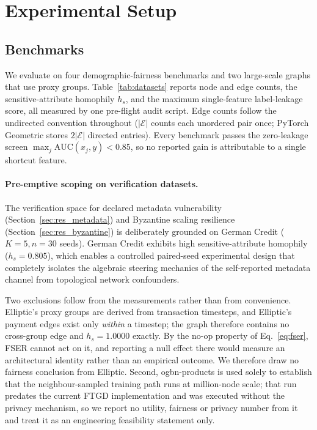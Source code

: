 \documentclass[preprint,12pt]{elsarticle}
\theoremstyle{plain}
\theoremstyle{definition}
\theoremstyle{remark}
\begin{document}
\section{Experimental Setup}
\label{sec:setup}

\subsection{Benchmarks}
\label{sec:datasets}
We evaluate on four demographic-fairness benchmarks and two large-scale graphs that use proxy groups. Table~\ref{tab:datasets} reports node and edge counts, the sensitive-attribute homophily $h_s$, and the maximum single-feature label-leakage score, all measured by one pre-flight audit script. Edge counts follow the undirected convention throughout ($\lvert\mathcal{E}\rvert$ counts each unordered pair once; PyTorch Geometric stores $2\lvert\mathcal{E}\rvert$ directed entries). Every benchmark passes the zero-leakage screen $\max_j \mathrm{AUC}(x_j,y) < 0.85$, so no reported gain is attributable to a single shortcut feature.



\paragraph{Pre-emptive scoping on verification datasets.}
The verification space for declared metadata vulnerability (Section~\ref{sec:res_metadata}) and Byzantine scaling resilience (Section~\ref{sec:res_byzantine}) is deliberately grounded on German Credit ($K=5, n=30$ seeds). German Credit exhibits high sensitive-attribute homophily ($h_s = 0.805$), which enables a controlled paired-seed experimental design that completely isolates the algebraic steering mechanics of the self-reported metadata channel from topological network confounders.

Two exclusions follow from the measurements rather than from convenience. Elliptic's proxy groups are derived from transaction timesteps, and Elliptic's payment edges exist only \emph{within} a timestep; the graph therefore contains no cross-group edge and $h_s = 1.0000$ exactly. By the no-op property of Eq.~\eqref{eq:fser}, FSER cannot act on it, and reporting a null effect there would measure an architectural identity rather than an empirical outcome. We therefore draw no fairness conclusion from Elliptic. Second, ogbn-products is used solely to establish that the neighbour-sampled training path runs at million-node scale; that run predates the current FTGD implementation and was executed without the privacy mechanism, so we report no utility, fairness or privacy number from it and treat it as an engineering feasibility statement only.
\end{document}
